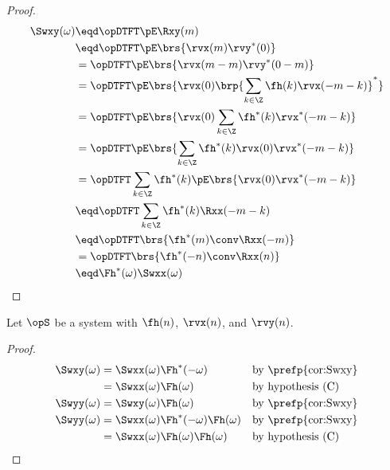 \begin{proof}
\begin{align*}
  \Swxy(\omega)
    &\eqd \opDTFT\pE\Rxy(m)
  \\&\eqd \opDTFT\pE\brs{\rvx(m)\rvy^\ast(0)}
  \\&=    \opDTFT\pE\brs{\rvx(m-m)\rvy^\ast(0-m)}
  \\&=    \opDTFT\pE\brs{\rvx(0)\brp{\sum_{k\in\Z} \fh(k)           \rvx(-m-k)}^\ast}
  \\&=    \opDTFT\pE\brs{\rvx(0)     \sum_{k\in\Z} \fh^\ast(k)      \rvx^\ast(-m-k)}
  \\&=    \opDTFT\pE\brs{            \sum_{k\in\Z} \fh^\ast(k)      \rvx(0)\rvx^\ast(-m-k)}
  \\&=    \opDTFT                    \sum_{k\in\Z} \fh^\ast(k) \pE\brs{\rvx(0)\rvx^\ast(-m-k)}
  \\&\eqd \opDTFT                    \sum_{k\in\Z} \fh^\ast(k) \Rxx(-m-k)
  \\&\eqd \opDTFT                             \brs{\fh^\ast(m) \conv \Rxx(-m)}
  \\&=    \opDTFT                             \brs{\fh^\ast(-n) \conv \Rxx(n)}
  \\&\eqd \Fh^\ast(\omega) \Swxx(\omega)
\end{align*}
\end{proof}

\begin{corollary}
\label{cor:Swxy}
Let $\opS$ be a system with  $\fh(n)$, 
 $\rvx(n)$, and  $\rvy(n)$.
\end{corollary}
\begin{proof}
\begin{align*}
   \Swxy(\omega)
     &= \Swxx(\omega) \Fh^\ast(-\omega)
     && \text{by \prefp{cor:Swxy}}
   \\&= \Swxx(\omega) \Fh(\omega)
     && \text{by hypothesis (C)}
   \\
   \Swyy(\omega)
     &= \Swxy(\omega) \Fh(\omega)
     && \text{by \prefp{cor:Swxy}}
   \\
   \Swyy(\omega)
     &= \Swxx(\omega) \Fh^\ast(-\omega) \Fh(\omega)
     && \text{by \prefp{cor:Swxy}}
   \\&= \Swxx(\omega) \Fh(\omega) \Fh(\omega)
     && \text{by hypothesis (C)}
\end{align*}
\end{proof}

